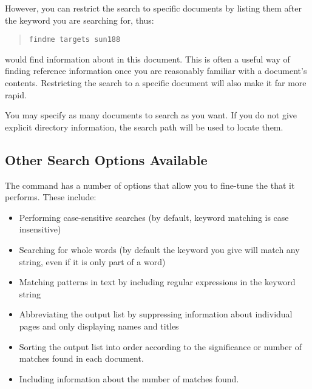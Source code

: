 However, you can restrict the search to specific documents by listing
them after the keyword you are searching for, thus:

\begin{quote}
\begin{verbatim}
findme targets sun188
\end{verbatim}
\end{quote}

would find information about  in this document. This is
often a useful way of finding reference information once you are
reasonably familiar with a document's contents. Restricting the search
to a specific document will also make it far more rapid.

You may specify as many documents to search as you want. If you do not
give explicit directory information, the  search path
will be used to locate them.

\subsection{Other Search Options Available}

The  command has a number of options that allow
you to fine-tune the  that
it performs. These include:

\begin{itemize}
\item Performing case-sensitive searches (by default, keyword matching
is case insensitive)

\item Searching for whole words (by default the keyword you give will
match any string, even if it is only part of a word)

\item Matching patterns in text by including regular expressions in
the keyword string

\item Abbreviating the output list by suppressing information about
individual  pages and only displaying
 names and titles

\item Sorting the output list into order according to the significance
or number of matches found in each document.

\item Including information about the number of matches found.
\end{itemize}

